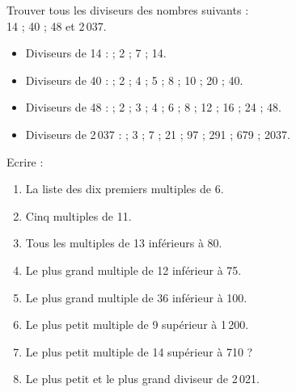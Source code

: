 \begin{colonne*exercice}

\bigskip

 \begin{exercice} %
   Trouver tous les diviseurs des nombres suivants : \\
   14 ; 40 ; 48 et 2\,037.
\end{exercice}

\begin{corrige}
   \begin{itemize}
      \item Diviseurs de 14 : { ; 2 ; 7 ; 14}.
      \item Diviseurs de 40 : { ; 2 ; 4 ; 5 ; 8 ; 10 ; 20 ; 40}.
      \item Diviseurs de 48 : { ; 2 ; 3 ; 4 ; 6 ; 8 ; 12 ; 16 ; 24 ; 48}.
      \item Diviseurs de 2\,037 : { ; 3 ; 7 ; 21 ; 97 ; 291 ; 679 ; 2037}.
   \end{itemize}
\end{corrige}

\bigskip


\begin{exercice} %
   Ecrire :
   \begin{enumerate}
      \item La liste des dix premiers multiples de 6.
      \item Cinq multiples de 11.
      \item Tous les multiples de 13 inférieurs à 80.
      \item Le plus grand multiple de 12 inférieur à 75.
      \item Le plus grand multiple de 36 inférieur à 100.
      \item Le plus petit multiple de 9 supérieur à 1\,200.
      \item Le plus petit multiple de 14 supérieur à 710 ?
      \item Le plus petit et le plus grand diviseur de 2\,021.
   \end{enumerate}
\end{exercice}


\end{colonne*exercice}
